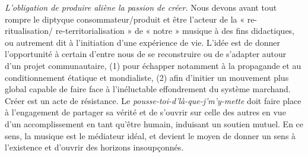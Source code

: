 \documentclass{article}
\begin{document}
\textit{L’obligation de produire aliène la passion de créer. 
}%
Nous devons avant tout rompre le diptyque consommateur/produit et être l'acteur de la « re-ritualisation/ re-territorialisation » de « notre » musique à des fins didactiques, ou autrement dit à l'initiation d'une expérience de vie.
%
L’idée est de donner l’opportunité à certain d’entre nous de se reconstruire ou de s’adapter autour d’un projet communautaire, (1) pour échapper notamment à la propagande et au conditionnement étatique et mondialiste, (2) afin d’initier un mouvement plus global capable de faire face à l’inéluctable effondrement du système marchand. Créer est un acte de résistance. Le \textit{pousse-toi-d'là-que-j'm'y-mette} doit faire place à l'engagement de partager sa vérité et de s'ouvrir sur celle des autres en vue d'un accomplissement en tant qu'être humain, induisant un soutien mutuel. En ce sens, la musique est le médiateur idéal, et devient le moyen de donner un sens à l’existence et d'ouvrir des horizons insoupçonnés. 

\bigskip
\end{document}

